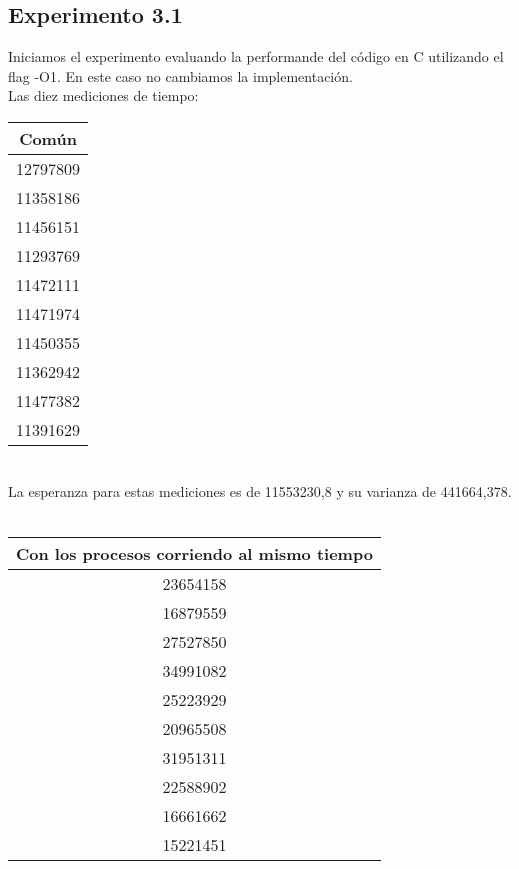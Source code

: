 ﻿\documentclass[a4paper]{article}
\begin{document}
\subsection{Experimento 3.1}
Iniciamos el experimento evaluando la performande del c\'odigo en C utilizando el flag -O1. En este caso no cambiamos la implementaci\'on.
\ \\
Las diez mediciones de tiempo:
\ \\
\begin{center}
  \begin{tabular}{| c |}
    \hline
    Com\'un\\ 
    \hline\hline
    12797809\\
    \hline
    11358186\\
    \hline
    11456151\\
    \hline
    11293769\\
    \hline
    11472111\\
    \hline
    11471974\\
    \hline
    11450355\\
    \hline
    11362942\\
    \hline
    11477382\\
    \hline
    11391629\\
    \hline
  \end{tabular}
\end{center}
\ \\
La esperanza para estas mediciones es de 11553230,8 y su varianza de 441664,378.
\ \\
\begin{center}
  \begin{tabular}{| c |}
    \hline
    Con los procesos corriendo al mismo tiempo\\ 
    \hline\hline
    23654158\\
    \hline
    16879559\\
    \hline
    27527850\\
    \hline
    34991082\\
    \hline
    25223929\\
    \hline
    20965508\\
    \hline
    31951311\\
    \hline
    22588902\\
    \hline
    16661662\\
    \hline
    15221451\\

    \hline
  \end{tabular}
\end{center}
\end{document}
